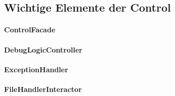 \documentclass[parskip=full]{scrartcl}
\begin{document}
\subsection{Wichtige Elemente der Control}
\paragraph{ControlFacade}
\paragraph{DebugLogicController}
\paragraph{ExceptionHandler}
\paragraph{FileHandlerInteractor}
\end{document}
